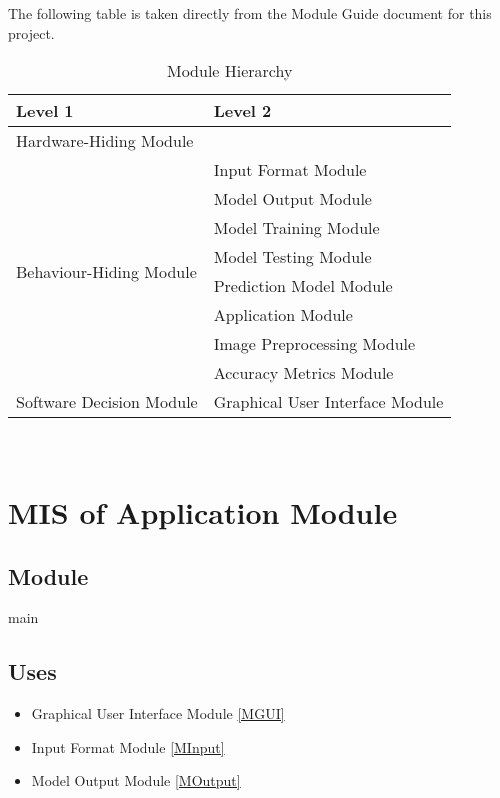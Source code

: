 \documentclass[12pt, titlepage]{article}
\begin{document}
The following table is taken directly from the Module Guide document for this project.

\begin{table}[h!]
\centering
\begin{tabular}{p{} p{}}
\toprule
\textbf{Level 1} & \textbf{Level 2}\\
\midrule

{Hardware-Hiding Module} & ~ \\
\midrule

\multirow{8}{0.3\textwidth}{Behaviour-Hiding Module} &
Input Format Module\\
& Model Output Module\\
& Model Training Module\\
& Model Testing Module\\
& Prediction Model Module\\
& Application Module\\
& Image Preprocessing Module\\
& Accuracy Metrics Module\\
\midrule

\multirow{1}{0.3\textwidth}{Software Decision Module}&
Graphical User Interface Module\\
\bottomrule

\end{tabular}
\caption{Module Hierarchy}
\label{TblMH}
\end{table}

\newpage
~\newpage

\section{MIS of Application Module} \label{MApplication}

\subsection{Module}

main

\subsection{Uses}

\begin{itemize}
  \item Graphical User Interface Module \ref{MGUI}
  \item Input Format Module \ref{MInput}
  \item Model Output Module \ref{MOutput}
\end{itemize}
\end{document}
